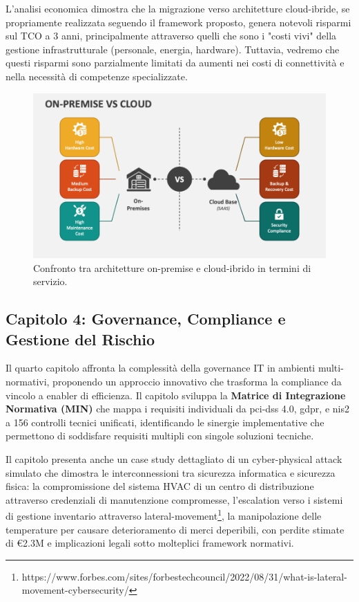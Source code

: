 L'analisi economica dimostra che la migrazione verso architetture cloud-ibride, se propriamente realizzata seguendo il framework proposto, genera notevoli risparmi sul TCO a 3 anni, principalmente attraverso quelli che sono i "costi vivi" della gestione infrastrutturale (personale, energia, hardware). Tuttavia, vedremo che questi risparmi sono parzialmente limitati da aumenti nei costi di connettività e nella necessità di competenze specializzate.
\begin{figure}[H]
    \centering
    \includegraphics[width=\textwidth]{thesis_figures/cap1/on-premise-vs-cloud.png}
    \caption{Confronto tra architetture on-premise e cloud-ibrido in termini di servizio.}
    \label{fig:on-premise-vs-cloud}
\end{figure}

\subsection{\texorpdfstring{\textbf{Capitolo 4: Governance, Compliance e Gestione del Rischio}}{1.6.3 - Capitolo 4: Governance, Compliance e Gestione del Rischio}}

\label{ssec:struttura_cap4}
Il quarto capitolo affronta la complessità della governance IT in ambienti multi-normativi, proponendo un approccio innovativo che trasforma la compliance da vincolo a enabler di efficienza. Il capitolo sviluppa la \textbf{Matrice di Integrazione Normativa (MIN)} che mappa i requisiti individuali da \gls{pci-dss} 4.0, \gls{gdpr}, e \gls{nis2} a 156 controlli tecnici unificati, identificando le sinergie implementative che permettono di soddisfare requisiti multipli con singole soluzioni tecniche.

Il capitolo presenta anche un case study dettagliato di un cyber-physical attack simulato che dimostra le interconnessioni tra sicurezza informatica e sicurezza fisica: la compromissione del sistema HVAC di un centro di distribuzione attraverso credenziali di manutenzione compromesse, l'escalation verso i sistemi di gestione inventario attraverso \gls{lateral-movement}\footnote{https://www.forbes.com/sites/forbestechcouncil/2022/08/31/what-is-lateral-movement-cybersecurity/}, la manipolazione delle temperature per causare deterioramento di merci deperibili, con perdite stimate di €2.3M e implicazioni legali sotto molteplici framework normativi.

